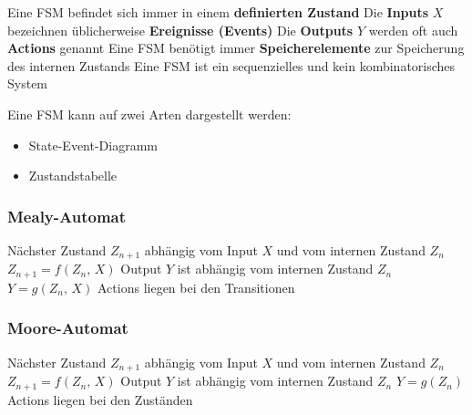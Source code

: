 \vspace{0.1cm}

\begin{outline}
    \1 Eine FSM befindet sich immer in einem \textbf{definierten Zustand}
    \1 Die \textbf{Inputs} $X$ bezeichnen üblicherweise \textbf{Ereignisse (Events)}
    \1 Die \textbf{Outputs} $Y$ werden oft auch \textbf{Actions} genannt
    \1 Eine FSM benötigt immer \textbf{Speicherelemente} zur Speicherung des internen Zustands
        \2 Eine FSM ist ein sequenzielles und kein kombinatorisches System
\end{outline}

\vspace{0.2cm}

Eine FSM kann auf zwei Arten dargestellt werden:

\vspace{0.1cm}

\begin{minipage}[t]{0.48\columnwidth}
    \begin{itemize}
        \item State-Event-Diagramm
    \end{itemize}
\end{minipage}
\hfill
\begin{minipage}[t]{0.48\columnwidth}
    \begin{itemize}
        \item Zustandstabelle
    \end{itemize}
\end{minipage}


\subsubsection{Mealy-Automat}

\begin{outline}
    \1 Nächster Zustand $Z_{n+1}$ abhängig vom Input $X$ und vom internen Zustand $Z_n$
        \2 $Z_{n+1} = f(Z_n, \, X)$
    \1 Output $Y$ ist abhängig vom internen Zustand $Z_n$ \textbf{}
        \2 $Y = g(Z_n , \, X)$
    \1 Actions liegen bei den Transitionen
\end{outline}


\subsubsection{Moore-Automat}

\begin{outline}
    \1 Nächster Zustand $Z_{n+1}$ abhängig vom Input $X$ und vom internen Zustand $Z_n$
        \2 $Z_{n+1} = f(Z_n, \, X)$
    \1 Output $Y$ ist \textbf{} abhängig vom internen Zustand $Z_n$ 
        \2 $Y = g(Z_n)$
    \1 Actions liegen bei den Zuständen
\end{outline}

